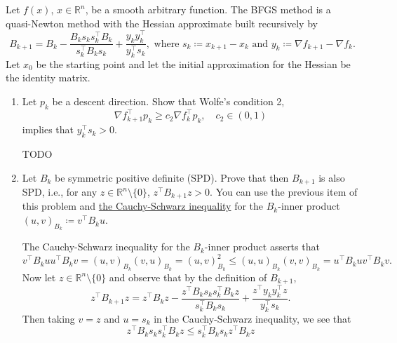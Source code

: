 \documentclass{../kin_math}
\begin{document}
\begin{questions}
  \question Let $f(x)$, $x \in \mathbb{R}^n$, be a smooth arbitrary function. The BFGS method is a quasi-Newton method with the Hessian approximate built recursively by
  \begin{equation*}
    B_{k + 1} = B_k - \frac{B_k s_k s_k^\top B_k}{s_k^\top B_k s_k} + \frac{y_k y_k^\top}{y_k^\top s_k}, \text{ where } s_k \coloneqq x_{k + 1} - x_k \text{ and } y_k \coloneqq \nabla f_{k + 1} - \nabla f_k.
  \end{equation*}
  Let $x_0$ be the starting point and let the initial approximation for the Hessian be the identity matrix.
  \begin{enumerate}
    \item Let $p_k$ be a descent direction. Show that Wolfe's condition 2,
    \begin{equation*}
      \nabla f_{k + 1}^\top p_k \geq c_2 \nabla f_k^\top p_k, \quad c_2 \in (0, 1)
    \end{equation*}
    implies that $y_k^\top s_k > 0$.
    \begin{solution}
      TODO
    \end{solution}
    \item Let $B_k$ be symmetric positive definite (SPD). Prove that then $B_{k + 1}$ is also SPD, i.e., for any $z \in \mathbb{R}^n \setminus \{0\}$, $z^\top B_{k + 1} z > 0$. You can use the previous item of this problem and \href{https://en.wikipedia.org/wiki/Cauchy%E2%80%93Schwarz_inequality}{the Cauchy-Schwarz inequality} for the $B_k$-inner product $(u, v)_{B_k} \coloneqq v^\top B_k u$.
    \begin{solution}
      The Cauchy-Schwarz inequality for the $B_k$-inner product asserts that
      \begin{equation*}
        v^\top B_k u u^\top B_k v = (u, v)_{B_k} (v, u)_{B_k} = (u, v)_{B_k}^2 \leq (u, u)_{B_k} (v, v)_{B_k} = u^\top B_k u v^\top B_k v.
      \end{equation*}
      Now let $z \in \mathbb{R}^n \setminus \{0\}$ and observe that by the definition of $B_{k + 1}$,
      \begin{equation*}
        z^\top B_{k + 1} z = z^\top B_k z - \frac{z^\top B_k s_k s_k^\top B_k z}{s_k^\top B_k s_k} + \frac{z^\top  y_k y_k^\top z}{y_k^\top s_k}.
      \end{equation*}
      Then taking $v = z$ and $u = s_k$ in the Cauchy-Schwarz inequality, we see that
      \begin{equation*}
        z^\top B_k s_k s_k^\top B_k z \leq s_k^\top B_k s_k z^\top B_k z
      \end{equation*}

\end{solution}
\end{enumerate}
\end{questions}
\end{document}
